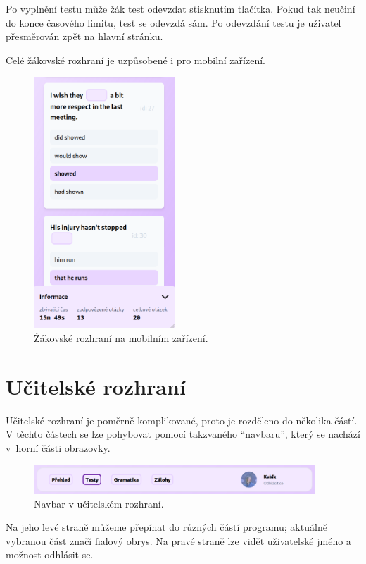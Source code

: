 Po vyplnění testu může žák test odevzdat stisknutím tlačítka. Pokud tak neučiní do konce časového limitu, test se odevzdá sám. Po odevzdání testu je uživatel přesměrován zpět na hlavní stránku.

Celé žákovské rozhraní je uzpůsobené i pro mobilní zařízení.

\begin{figure}[H]
    \centering
    \includegraphics[width=200px]{images/01design/test-mobile.png}
    \caption{Žákovské rozhraní na mobilním zařízení.}
\end{figure}

\section{Učitelské rozhraní}
\label{sec:admin}

Učitelské rozhraní je poměrně komplikované, proto je rozděleno do několika částí. V těchto částech se lze pohybovat pomocí takzvaného \enquote{navbaru}, který se nachází v~horní části obrazovky.

\begin{figure}[H]
    \centering
    \includegraphics[width=400px]{images/01design/navbar.png}
    \caption{Navbar v učitelském rozhraní.}
\end{figure}

Na jeho levé straně můžeme přepínat do různých částí programu; aktuálně vybranou část značí fialový obrys. Na pravé straně lze vidět uživatelské jméno a možnost odhlásit se.

